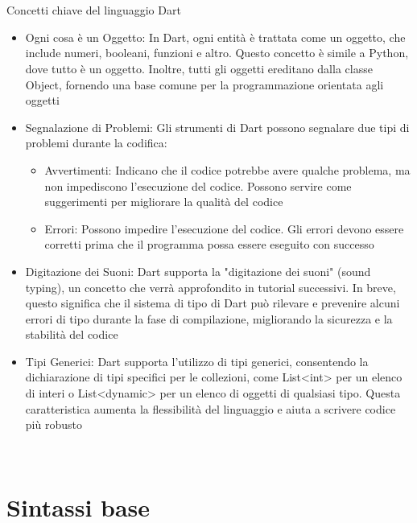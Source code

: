 \documentclass{report}
\begin{document}
\\
\\
Concetti chiave del linguaggio Dart
\\
\begin{itemize}
  \item{Ogni cosa è un Oggetto:
In Dart, ogni entità è trattata come un oggetto, che include numeri, booleani, funzioni e altro. Questo concetto è simile a Python, dove tutto è un oggetto. Inoltre, tutti gli oggetti ereditano dalla classe Object, fornendo una base comune per la programmazione orientata agli oggetti}
  \item{Segnalazione di Problemi:
Gli strumenti di Dart possono segnalare due tipi di problemi durante la codifica: 
\begin{itemize}
  \item{Avvertimenti: Indicano che il codice potrebbe avere qualche problema, ma non impediscono l'esecuzione del codice. Possono servire come suggerimenti per migliorare la qualità del codice}
  \item{Errori: Possono impedire l'esecuzione del codice. Gli errori devono essere corretti prima che il programma possa essere eseguito con successo}
\end{itemize}
}
  \item{Digitazione dei Suoni:
Dart supporta la "digitazione dei suoni" (sound typing), un concetto che verrà approfondito in tutorial successivi. In breve, questo significa che il sistema di tipo di Dart può rilevare e prevenire alcuni errori di tipo durante la fase di compilazione, migliorando la sicurezza e la stabilità del codice}
  \item{Tipi Generici:
Dart supporta l'utilizzo di tipi generici, consentendo la dichiarazione di tipi specifici per le collezioni, come List<int> per un elenco di interi o List<dynamic> per un elenco di oggetti di qualsiasi tipo. Questa caratteristica aumenta la flessibilità del linguaggio e aiuta a scrivere codice più robusto}
\end{itemize}
\\
\section{Sintassi base}
\\
\end{document}
